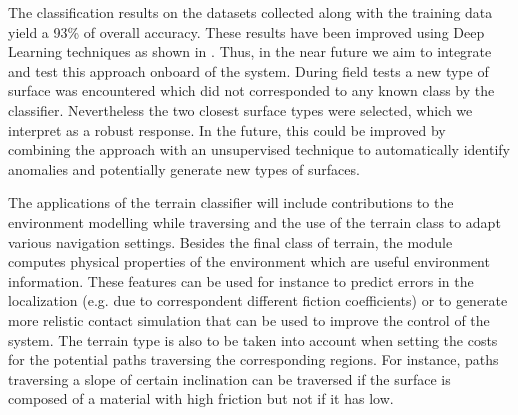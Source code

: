 \documentclass{article}
\begin{document}
The classification results on the datasets collected along with the training data yield a 93\% of overall accuracy. 
These results have been improved using Deep Learning techniques as shown in \cite{ugenti2021}. 
Thus, in the near future we aim to integrate and test this approach onboard of the system.
During field tests a new type of surface was encountered which did not corresponded to any known class by the classifier. 
Nevertheless the two closest surface types were selected, which we interpret as a robust response.
In the future, this could be improved by combining the approach with an unsupervised technique to automatically identify anomalies and potentially generate new types of surfaces.

The applications of the terrain classifier will include contributions to the environment modelling while traversing and the use of the terrain class to adapt various navigation settings.
Besides the final class of terrain, the module computes physical properties of the environment which are useful environment information. 
These features can be used for instance to predict errors in the localization (e.g. due to correspondent different fiction coefficients) or to generate more relistic contact simulation that can be used to improve the control of the system.
The terrain type is also to be taken into account when setting the costs for the potential paths traversing the corresponding regions. 
For instance, paths traversing a slope of certain inclination can be traversed if the surface is composed of a material with high friction but not if it has low.


\FloatBarrier



\end{document}
